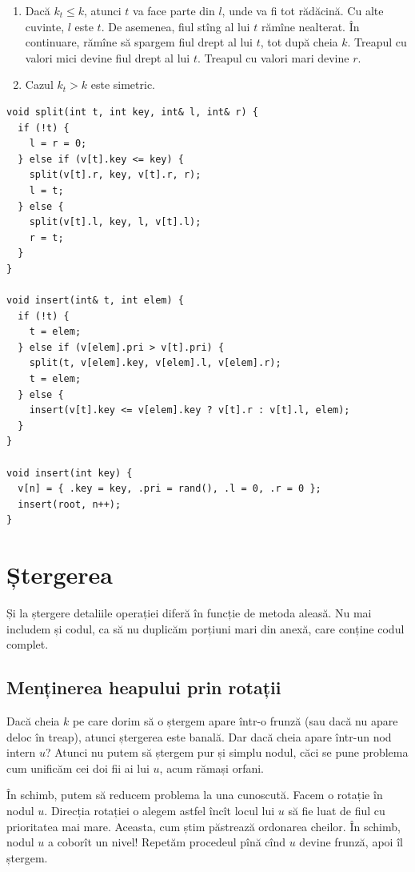\documentclass[../main.tex]{subfiles}
\begin{document}
\begin{enumerate}
  \item Dacă $k_t \leq k$, atunci $t$ va face parte din $l$, unde va fi tot rădăcină. Cu alte cuvinte, $l$ este $t$. De asemenea, fiul stîng al lui $t$ rămîne nealterat. În continuare, rămîne să spargem fiul drept al lui $t$, tot după cheia $k$. Treapul cu valori mici devine fiul drept al lui $t$. Treapul cu valori mari devine $r$.
  \item Cazul $k_t > k$ este simetric.
\end{enumerate}

\begin{verbatim}
void split(int t, int key, int& l, int& r) {
  if (!t) {
    l = r = 0;
  } else if (v[t].key <= key) {
    split(v[t].r, key, v[t].r, r);
    l = t;
  } else {
    split(v[t].l, key, l, v[t].l);
    r = t;
  }
}

void insert(int& t, int elem) {
  if (!t) {
    t = elem;
  } else if (v[elem].pri > v[t].pri) {
    split(t, v[elem].key, v[elem].l, v[elem].r);
    t = elem;
  } else {
    insert(v[t].key <= v[elem].key ? v[t].r : v[t].l, elem);
  }
}

void insert(int key) {
  v[n] = { .key = key, .pri = rand(), .l = 0, .r = 0 };
  insert(root, n++);
}
\end{verbatim}


\section{Ștergerea}

Și la ștergere detaliile operației diferă în funcție de metoda aleasă. Nu mai includem și codul, ca să nu duplicăm porțiuni mari din anexă, care conține codul complet.


\subsection{Menținerea heapului prin rotații}

Dacă cheia $k$ pe care dorim să o ștergem apare într-o frunză (sau dacă nu apare deloc în treap), atunci ștergerea este banală. Dar dacă cheia apare într-un nod intern $u$? Atunci nu putem să ștergem pur și simplu nodul, căci se pune problema cum unificăm cei doi fii ai lui $u$, acum rămași orfani.

În schimb, putem să reducem problema la una cunoscută. Facem o rotație în nodul $u$. Direcția rotației o alegem astfel încît locul lui $u$ să fie luat de fiul cu prioritatea mai mare. Aceasta, cum știm păstrează ordonarea cheilor. În schimb, nodul $u$ a coborît un nivel! Repetăm procedeul pînă cînd $u$ devine frunză, apoi îl ștergem.
\end{document}
